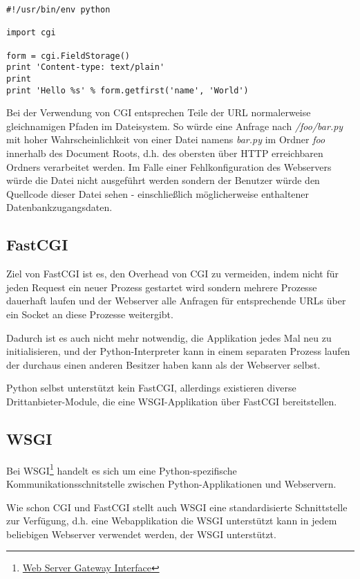 \begin{lstlisting}[caption=Python-CGI-Skript,label=lst:python-cgi]
#!/usr/bin/env python

import cgi

form = cgi.FieldStorage()
print 'Content-type: text/plain'
print
print 'Hello %s' % form.getfirst('name', 'World')
\end{lstlisting}

Bei der Verwendung von CGI entsprechen Teile der URL normalerweise gleichnamigen Pfaden im
Dateisystem. So würde eine Anfrage nach \emph{/foo/bar.py} mit hoher Wahrscheinlichkeit von einer
Datei namens \emph{bar.py} im Ordner \emph{foo} innerhalb des Document Roots, d.h. des obersten über
HTTP erreichbaren Ordners verarbeitet werden. Im Falle einer Fehlkonfiguration des Webservers würde
die Datei nicht ausgeführt werden sondern der Benutzer würde den Quellcode dieser Datei sehen -
einschließlich möglicherweise enthaltener Datenbankzugangsdaten.

\subsection{FastCGI}

Ziel von FastCGI ist es, den Overhead von CGI zu vermeiden, indem nicht für jeden Request ein neuer
Prozess gestartet wird sondern mehrere Prozesse dauerhaft laufen und der Webserver alle Anfragen für
entsprechende URLs über ein Socket an diese Prozesse weitergibt.

Dadurch ist es auch nicht mehr notwendig, die Applikation jedes Mal neu zu initialisieren, und der
Python-Interpreter kann in einem separaten Prozess laufen der durchaus einen anderen Besitzer haben
kann als der Webserver selbst.

Python selbst unterstützt kein FastCGI, allerdings existieren diverse Drittanbieter-Module, die
eine WSGI-Applikation über FastCGI bereitstellen.

\subsection{WSGI}

Bei WSGI\footnote{\href{http://www.python.org/dev/peps/pep-0333/}{Web Server Gateway Interface}}
handelt es sich um eine Python-spezifische Kommunikationsschnitstelle zwischen Python-Applikationen
und Webservern.

Wie schon CGI und FastCGI stellt auch WSGI eine standardisierte Schnittstelle zur Verfügung, d.h.
eine Webapplikation die WSGI unterstützt kann in jedem beliebigen Webserver verwendet werden, der
WSGI unterstützt.

